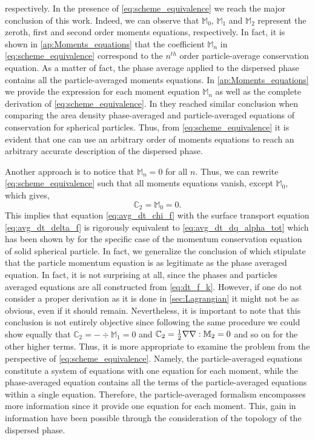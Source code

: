 respectively. 
In the presence of \ref{eq:scheme_equivalence} we reach the major conclusion of this work. 
Indeed, we can observe that $\mathbb{M}_0$, $\mathbb{M}_1$ and $\mathbb{M}_2$ represent the zeroth, first and second order moments equations, respectively. 
In fact, it is shown in \ref{ap:Moments_equations} that the coefficient $\mathbb{M}_n$ in \ref{eq:scheme_equivalence} correspond to the $n^{th}$ order particle-average conservation equation. 
As a matter of fact, the phase average applied to the dispersed phase contains all the particle-averaged moments equations.
In \ref{ap:Moments_equations} we provide the expression for each moment equation $\mathbb{M}_n$ as well as the complete derivation of \ref{eq:scheme_equivalence}. 
In \cite{lhuillier2000bilan} they reached similar conclusion when comparing the area density phase-averaged and particle-averaged equations of conservation for spherical particles. 
Thus, from \ref{eq:scheme_equivalence} it is evident that one can use an arbitrary order of moments equations to reach an arbitrary accurate description of the dispersed phase.

Another approach is to notice that $\mathbb{M}_n=0$ for all $n$. Thus, we can rewrite \ref{eq:scheme_equivalence} such that all moments equations vanish, except $\mathbb{M}_0$, which gives, 
\begin{equation}
    \mathbb{C}_2 = \mathbb{M}_0 = 0.
\end{equation}
This implies that equation \ref{eq:avg_dt_chi_f} with the surface transport equation \ref{eq:avg_dt_delta_f} is rigorously equivalent to \ref{eq:avg_dt_dq_alpha_tot} which has been shown by \cite[Appendix A]{nott2011suspension} for the specific case of the momentum conservation equation of solid spherical particle.
In fact, we generalize the conclusion of \citet[Appendix A]{zhang1997momentum} which stipulate that the particle momentum equation is as legitimate as the phase averaged equation. 
In fact, it is not surprising at all, since the phases and particles averaged equations are all constructed from \ref{eq:dt_f_k}.
However, if one do not consider a proper derivation as it is done in \ref{sec:Lagrangian} it might not be as obvious, even if it should remain.
Nevertheless, it is important to note that this conclusion is not entirely objective since following the same procedure we could show equally that $\mathbb{C}_2  = -\div\mathbb{M}_1=0$ and $\mathbb{C}_2  = \frac{1}{2}\mathbf{\nabla}\mathbf{\nabla}:\mathbb{M}_2=0$ and so on for the other higher terms. 
Thus, it is more appropriate to examine the problem from the perspective of \ref{eq:scheme_equivalence}. 
Namely, the particle-averaged equations constitute a system of equations with one equation for each moment, while the phase-averaged equation contains all the terms of the particle-averaged equations within a single equation.
Therefore, the particle-averaged formalism encompasses more information since it provide one equation for each moment. 
This,  gain in information have been possible through the consideration of the topology of the dispersed phase. 

